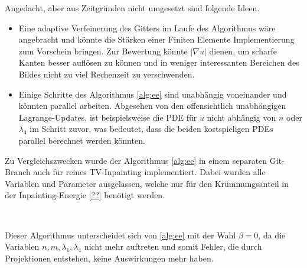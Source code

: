 \documentclass{mythesis}
\begin{document}
Angedacht, aber aus Zeitgründen nicht umgesetzt sind folgende Ideen.
\begin{itemize}
    \item
	Eine adaptive Verfeinerung des Gitters im Laufe des Algorithmus wäre angebracht und könnte die Stärken einer Finiten Elemente Implementierung zum Vorschein bringen.
	Zur Bewertung könnte $|\nabla u|$ dienen, um scharfe Kanten besser auflösen zu können und in weniger interessanten Bereichen des Bildes nicht zu viel Rechenzeit zu verschwenden.
    \item
	Einige Schritte des Algorithmus \ref{alg:ee} sind unabhängig voneinander und könnten parallel arbeiten.
	Abgesehen von den offensichtlich unabhängigen Lagrange-Updates, ist beispielsweise die PDE für $u$ nicht abhängig von $n$ oder $\lambda_4$ im Schritt zuvor, was bedeutet, dass die beiden kostspieligen PDEs parallel berechnet werden könnten.
\end{itemize}

Zu Vergleichszwecken wurde der Algorithmus \ref{alg:ee} in einem separaten Git-Branch auch für reines TV-Inpainting implementiert.
Dabei wurden alle Variablen und Parameter ausgelassen, welche nur für den Krümmungsanteil in der Inpainting-Energie \ref{??} benötigt werden.

\begin{algorithm}[TV Inpainting] \label{alg:tv}
     \\
    \begin{algorithmic}
	\EndFor
    \end{algorithmic}
    \begin{note}
	Dieser Algorithmus unterscheidet sich von \ref{alg:ee} mit der Wahl $\beta = 0$, da die Variablen $n, m, \lambda_1, \lambda_4$ nicht mehr auftreten und somit Fehler, die durch Projektionen entstehen, keine Auswirkungen mehr haben.
    \end{note}
\end{algorithm}
\end{document}
